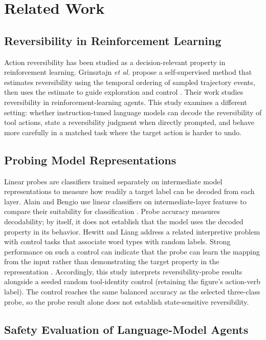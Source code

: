 \documentclass[conference]{IEEEtran}
\begin{document}
\section{Related Work}

\subsection{Reversibility in Reinforcement Learning}

Action reversibility has been studied as a decision-relevant property in
reinforcement learning. Grinsztajn \emph{et al.} propose a self-supervised
method that estimates reversibility using the temporal ordering of sampled
trajectory events, then uses the estimate to guide exploration and control
\cite{grinsztajn2021reversibility}. Their work studies reversibility in
reinforcement-learning agents. This study examines a different setting:
whether instruction-tuned language models can decode the reversibility of
tool actions, state a reversibility judgment when directly prompted, and
behave more carefully in a matched task where the target action is harder
to undo.

\subsection{Probing Model Representations}

Linear probes are classifiers trained separately on intermediate model
representations to measure how readily a target label can be decoded from each
layer. Alain and Bengio use linear classifiers on intermediate-layer features
to compare their suitability for classification \cite{alain2016understanding}.
Probe accuracy measures decodability; by itself, it does not establish that
the model uses the decoded property in its behavior. Hewitt and Liang address
a related interpretive problem with control tasks that associate word types
with random labels. Strong performance on such a control can indicate that the
probe can learn the mapping from the input rather than demonstrating the
target property in the representation \cite{hewittliang2019probes}.
Accordingly, this study interprets reversibility-probe results alongside a
seeded random tool-identity control (retaining the figure's action-verb
label). The control reaches the same balanced accuracy as the selected
three-class probe, so the probe result alone does not establish
state-sensitive reversibility.

\subsection{Safety Evaluation of Language-Model Agents}
\end{document}
